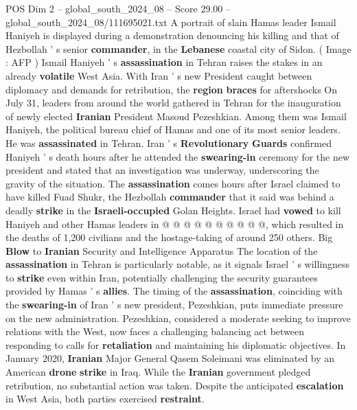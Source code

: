 \begin{textsample}{POS Dim 2 – global\_south\_2024\_08 – Score 29.00 – global\_south\_2024\_08/111695021.txt}  \label{ex:f2_pos_018}
A portrait of slain Hamas leader Ismail Haniyeh is displayed during a demonstration denouncing his killing and that of Hezbollah ' s senior \textbf{commander}, in the \textbf{Lebanese} coastal city of Sidon. ( Image : AFP ) Ismail Haniyeh ' s \textbf{assassination} in Tehran raises the stakes in an already \textbf{volatile} West Asia.
With Iran ' s new President caught between diplomacy and demands for retribution, the \textbf{region} \textbf{braces} for aftershocks On July 31, leaders from around the world gathered in Tehran for the inauguration of newly elected \textbf{Iranian} President Masoud Pezeshkian.
Among them was Ismail Haniyeh, the political bureau chief of Hamas and one of its most senior leaders.
He was \textbf{assassinated} in Tehran.
Iran ' s \textbf{Revolutionary} \textbf{Guards} confirmed Haniyeh ' s death hours after he attended the \textbf{swearing-in} ceremony for the new president and stated that an investigation was underway, underscoring the gravity of the situation.
The \textbf{assassination} comes hours after Israel claimed to have killed Fuad Shukr, the Hezbollah \textbf{commander} that it said was behind a deadly \textbf{strike} in the \textbf{Israeli-occupied} Golan Heights.
Israel had \textbf{vowed} to kill Haniyeh and other Hamas leaders in @ @ @ @ @ @ @ @ @ @, which resulted in the deaths of 1,200 civilians and the hostage-taking of around 250 others.
Big \textbf{Blow} to \textbf{Iranian} Security and Intelligence Apparatus The location of the \textbf{assassination} in Tehran is particularly notable, as it signals Israel ' s willingness to \textbf{strike} even within Iran, potentially challenging the security guarantees provided by Hamas ' s \textbf{allies}.
The timing of the \textbf{assassination}, coinciding with the \textbf{swearing-in} of Iran ' s new president, Pezeshkian, puts immediate pressure on the new administration.
Pezeshkian, considered a moderate seeking to improve relations with the West, now faces a challenging balancing act between responding to calls for \textbf{retaliation} and maintaining his diplomatic objectives.
In January 2020, \textbf{Iranian} Major General Qasem Soleimani was eliminated by an American \textbf{drone} \textbf{strike} in Iraq.
While the \textbf{Iranian} government pledged retribution, no substantial action was taken.
Despite the anticipated \textbf{escalation} in West Asia, both parties exercised \textbf{restraint}.

\end{textsample}
